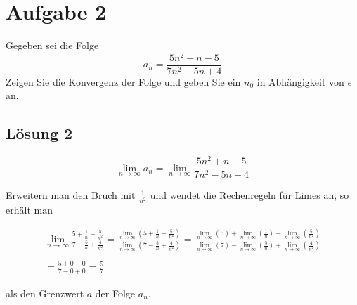 \section*{Aufgabe 2}

Gegeben sei die Folge
\begin{equation*}
  a_{n} =\frac{5n^{2} +n-5}{7n^{2} -5n+4}
\end{equation*}
Zeigen Sie die Konvergenz der Folge und geben Sie ein $\displaystyle n_{0}$ in Abhängigkeit von $\displaystyle \epsilon $ an.



\subsection*{Lösung 2}

\begin{equation*}
  \lim _{n\rightarrow \infty } a_{n} =\lim _{n\rightarrow \infty }\frac{5n^{2} +n-5}{7n^{2} -5n+4}
\end{equation*}


Erweitern man den Bruch mit $\displaystyle \frac{1}{n^{2}}$ und wendet die Rechenregeln für Limes an, so erhält man

\begin{gather*}
  \lim _{n\rightarrow \infty }\frac{5 +\frac{1}{n} -\frac{5}{n^{2}}}{7-\frac{5}{n} +\frac{4}{n^{2}}} =\frac{\lim\limits _{n\rightarrow \infty }\left( 5 +\frac{1}{n} -\frac{5}{n^{2}}\right)}{\lim\limits _{n\rightarrow \infty }\left( 7-\frac{5}{n} +\frac{4}{n^{2}}\right)} =\frac{\lim\limits _{n\rightarrow \infty }( 5) +\lim\limits _{n\rightarrow \infty }\left(\frac{1}{n}\right) -\lim\limits _{n\rightarrow \infty }\left(\frac{5}{n^{2}}\right)}{\lim\limits _{n\rightarrow \infty }( 7) -\lim\limits _{n\rightarrow \infty }\left(\frac{5}{n}\right) +\lim\limits _{n\rightarrow \infty }\left(\frac{4}{n^{2}}\right)}\\
  \\
  =\frac{5+0-0}{7-0+0} =\frac{5}{7}
\end{gather*}


als den Grenzwert $\displaystyle a$ der Folge $\displaystyle a_{n}$.\\

